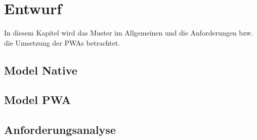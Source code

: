 \chapter{Entwurf}
\thispagestyle{standard}
\pagestyle{standard}
\renewcommand{\footrulewidth}{0.4pt}

In diesem Kapitel wird das Muster im Allgemeinen und die Anforderungen bzw. die Umsetzung der \aclp{PWA} betrachtet.



\section{Model Native}\label{sub:Model Native}


\section{Model PWA}\label{sub:Model PWA}

\section{Anforderungsanalyse}\label{sub:Anforderungsanalyse}


